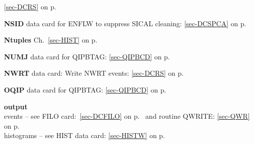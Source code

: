   \ref{sec-DCRS} on p.~\pageref{sec-DCRS}\\
 \item{\bf NSID    }data card for ENFLW to suppress SICAL cleaning: \ref{sec-DCSPCA} on p.~\pageref{sec-DCSPCA}\\
 \item{\bf Ntuples     }Ch.~\ref{sec-HIST} on p.~\pageref{sec-HIST}\\
 \item{\bf NUMJ    }data card for QIPBTAG: \ref{sec-QIPBCD} on p.~\pageref{sec-QIPBCD}\\
 \item{\bf NWRT    }data card: Write  NWRT events: \ref{sec-DCRS} on p.~\pageref{sec-DCRS}
 
 
 \item{\bf OQIP    }data card for QIPBTAG: \ref{sec-QIPBCD} on p.~\pageref{sec-QIPBCD}\\
 \item{\bf output  }\\
 \subitem events -- see FILO card:~\ref{sec-DCFILO} on p.~\pageref{sec-DCFILO}
 and routine QWRITE:
 \ref{sec-QWR} on p.~\pageref{sec-QWR}\\
 \subitem histograms -- see HIST data card: \ref{sec-HISTW} on p.~\pageref{sec-HISTW}
 
